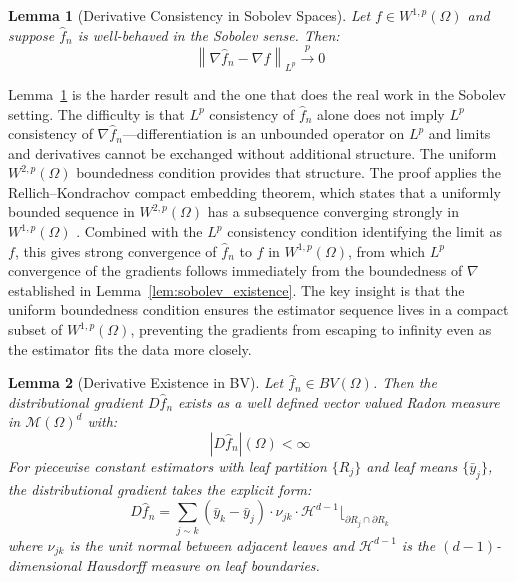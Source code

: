 \documentclass[12pt,a4paper]{article}
\numberwithin{equation}{section}
\theoremstyle{plain}
\newtheorem{lemma}{Lemma}
\theoremstyle{definition}
\newcommand{\norm}[1]{\left\| #1 \right\|}
\newcommand{\Wonep}{W^{1,p}(\Omega)}
\newcommand{\Wtwop}{W^{2,p}(\Omega)}
\newcommand{\BV}{BV(\Omega)}
\newcommand{\cM}{\mathcal{M}(\Omega)^d}
\newcommand{\fn}{\hat{f}_n}
\newcommand{\xrightarrowp}{\xrightarrow{p}}
\begin{document}
	\begin{lemma}[Derivative Consistency in Sobolev Spaces]
		\label{lem:sobolev_consistency}
		Let $f \in \Wonep$ and suppose $\fn$ is well-behaved in the Sobolev sense. Then:
		\begin{equation}
			\norm{\nabla \fn - \nabla f}_{L^p} \xrightarrowp 0
		\end{equation}
	\end{lemma}
	
	Lemma~\ref{lem:sobolev_consistency} is the harder result and the one that does the
	real work in the Sobolev setting. The difficulty is that $L^p$ consistency of $\fn$
	alone does not imply $L^p$ consistency of $\nabla \fn$---differentiation is an
	unbounded operator on $L^p$ and limits and derivatives cannot be exchanged without
	additional structure. The uniform $\Wtwop$ boundedness condition provides that
	structure. The proof applies the Rellich--Kondrachov compact embedding theorem, which
	states that a uniformly bounded sequence in $\Wtwop$ has a subsequence converging
	strongly in $\Wonep$ \citep[Theorem~5,~Section~5.7]{evans2010pde}. Combined with
	the $L^p$ consistency condition identifying the limit as $f$, this gives strong
	convergence of $\fn$ to $f$ in $\Wonep$, from which $L^p$ convergence of the
	gradients follows immediately from the boundedness of $\nabla$ established in
	Lemma~\ref{lem:sobolev_existence}. The key insight is that the uniform boundedness
	condition ensures the estimator sequence lives in a compact subset of $\Wonep$,
	preventing the gradients from escaping to infinity even as the estimator fits the
	data more closely.
	
	\begin{lemma}[Derivative Existence in BV]
		\label{lem:bv_existence}
		Let $\fn \in \BV$. Then the distributional gradient $D\fn$ exists as a well defined
		vector valued Radon measure in $\cM$ with:
		\begin{equation}
			|D\fn|(\Omega) < \infty
		\end{equation}
		For piecewise constant estimators with leaf partition $\{R_j\}$ and leaf means
		$\{\bar{y}_j\}$, the distributional gradient takes the explicit form:
		\begin{equation}
			D\fn = \sum_{j \sim k} (\bar{y}_k - \bar{y}_j) \cdot \nu_{jk} \cdot
			\mathcal{H}^{d-1}\lfloor_{\partial R_j \cap \partial R_k}
		\end{equation}
		where $\nu_{jk}$ is the unit normal between adjacent leaves and $\mathcal{H}^{d-1}$
		is the $(d-1)$-dimensional Hausdorff measure on leaf boundaries.
	\end{lemma}
	
\end{document}
